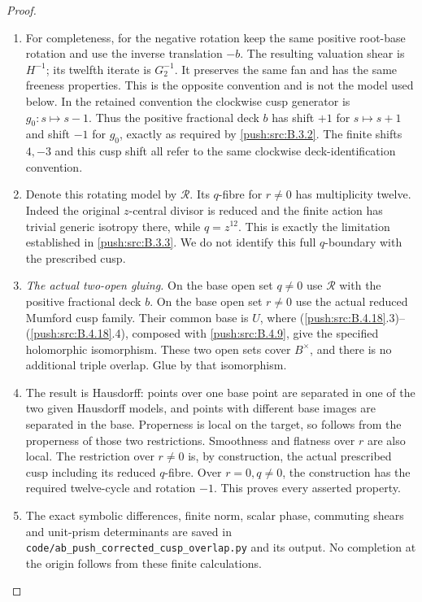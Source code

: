 \begin{proof}
\begin{enumerate}[label=\arabic*.,leftmargin=*]
\item For completeness, for the negative rotation keep the same positive
root-base rotation and use the inverse translation
$-b$. The resulting valuation shear is $H^{-1}$;
its twelfth iterate is $G_2^{-1}$. It preserves
the same fan and has the same freeness properties.
This is the opposite convention and is not the model
used below. In the retained convention the clockwise
cusp generator is $g_0:s\mapsto s-1$. Thus the
positive fractional deck $b$ has shift $+1$ for
$s\mapsto s+1$ and shift $-1$ for $g_0$, exactly
as required by \ref{push:src:B.3.2}. The finite shifts $4,-3$
and this cusp shift all refer to the same clockwise
deck-identification convention.

\item Denote this rotating model by $\mathcal R$.
Its $q$-fibre for $r\ne0$ has multiplicity twelve.
Indeed the original $z$-central divisor is reduced
and the finite action has trivial generic isotropy
there, while $q=z^{12}$. This is exactly the
limitation established in \ref{push:src:B.3.3}. We do not identify
this full $q$-boundary with the prescribed cusp.

\item \emph{The actual two-open gluing.}
On the base open set $q\ne0$ use $\mathcal R$ with
the positive fractional deck $b$. On the base open set $r\ne0$
use the actual reduced Mumford cusp family.
Their common base is $U$, where (\ref{push:src:B.4.18}.3)--
(\ref{push:src:B.4.18}.4), composed with \ref{push:src:B.4.9}, give the specified
holomorphic isomorphism. These two open sets cover
$B^\times$, and there is no additional triple
overlap. Glue by that isomorphism.

\item The result is Hausdorff: points over one base
point are separated in one of the two given
Hausdorff models, and points with different
base images are separated in the base.
Properness is local on the target, so follows
from the properness of those two restrictions.
Smoothness and flatness over $r$ are also local.
The restriction over $r\ne0$ is, by construction,
the actual prescribed cusp including its reduced
$q$-fibre. Over $r=0,q\ne0$, the construction has
the required twelve-cycle and rotation $-1$.
This proves every asserted property.

\item The exact symbolic differences, finite norm,
scalar phase, commuting shears and unit-prism
determinants are saved in
\texttt{code/ab\_push\_corrected\_cusp\_overlap.py}
and its output. No completion at the origin
follows from these finite calculations.
\end{enumerate}
\end{proof}


